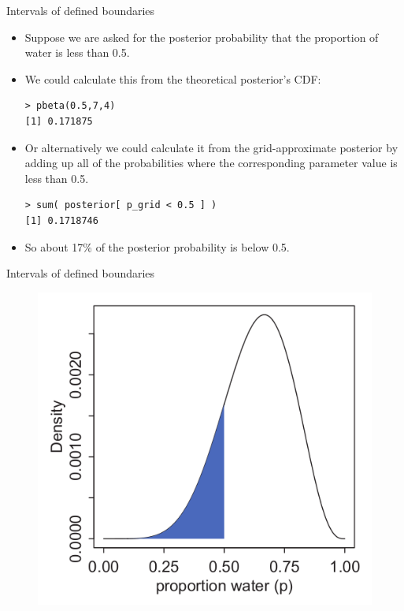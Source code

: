 \documentclass[handout]{beamer}
\begin{document}
\begin{frame}[fragile]{Intervals of defined boundaries}
\scriptsize{
\begin{itemize}

\item Suppose we are asked for the posterior probability that the proportion of water is less than 0.5. 

\item We could calculate this from the theoretical posterior's CDF:

\begin{verbatim}
> pbeta(0.5,7,4)
[1] 0.171875
\end{verbatim}



\item Or alternatively we could calculate it from the grid-approximate posterior by adding up all of the probabilities where the corresponding parameter value is less than 0.5.

\begin{verbatim}
> sum( posterior[ p_grid < 0.5 ] )
[1] 0.1718746
\end{verbatim}


\item So about 17\% of the posterior probability is below 0.5.

\end{itemize}



} 

\end{frame}



\begin{frame}{Intervals of defined boundaries}
\scriptsize{

   \begin{figure}[h!]
	\centering
	\includegraphics[scale=0.45]{pics/interval1.png}
	\end{figure} 




} 

\end{frame}
\end{document}
